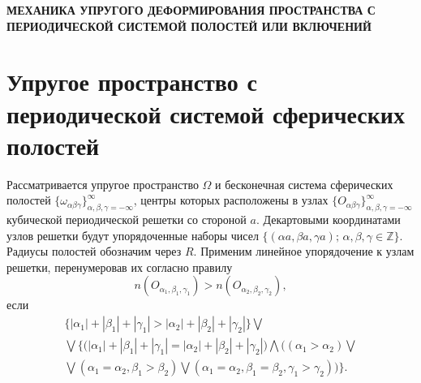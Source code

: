 
\begin{center}
{\normalsize\textbf{\centering\thechapter\; МЕХАНИКА УПРУГОГО ДЕФОРМИРОВАНИЯ ПРОСТРАНСТВА С ПЕРИОДИЧЕСКОЙ СИСТЕМОЙ ПОЛОСТЕЙ ИЛИ ВКЛЮЧЕНИЙ}}\vspace{14pt} 
\end{center}


\section[Упругое пространство с периодической системой сферических полостей]{Упругое пространство с периодической системой сферических полостей}

Рассматривается упругое пространство $\Omega$ и бесконечная система сферических полостей $\{\omega_{\alpha\beta\gamma}\}_{\alpha,\beta,\gamma=-\infty}^\infty$, центры которых расположены в узлах $\{O_{\alpha\beta\gamma}\}_{\alpha,\beta,\gamma=-\infty}^\infty$ кубической периодической решетки со стороной $a$. Декартовыми координатами узлов решетки будут упорядоченные наборы чисел $\{(\alpha a,\beta a,\gamma a);\,\alpha,\beta,\gamma\in\mathbb{Z}\}$. Радиусы полостей обозначим через $R$. Применим линейное упорядочение к узлам решетки, перенумеровав их согласно правилу\sloppy
$$
n(O_{\alpha_1,\beta_1,\gamma_1})>n(O_{\alpha_2,\beta_2,\gamma_2}),
$$
если 
\begin{multline}
\bigg\{|\alpha_1|+|\beta_1|+|\gamma_1|>|\alpha_2|+|\beta_2|+|\gamma_2|\bigg\}\bigvee \\
\bigvee\bigg\{\Big(|\alpha_1|+|\beta_1|+|\gamma_1|=|\alpha_2|+|\beta_2|+|\gamma_2|\Big)\bigwedge\Big((\alpha_1>\alpha_2)\bigvee \\
\bigvee(\alpha_1=\alpha_2,\beta_1>\beta_2)\bigvee(\alpha_1=\alpha_2,\beta_1=\beta_2,\gamma_1>\gamma_2)\Big)\bigg\}.
\end{multline}

